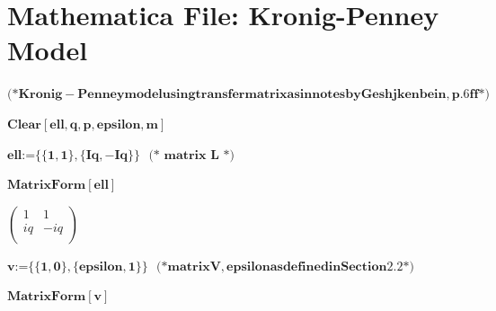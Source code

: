 

\chapter{Mathematica File: Kronig-Penney Model}{\label{Mathematica File: Kronig-Penney Model}


\begin{doublespace}
\noindent\(\pmb{\text{(*} \text{Kronig}-\text{Penney} \text{model} \text{using} \text{transfer} \text{matrix} \text{as} \text{in} \text{notes} \text{by}
\text{Geshjkenbein}, p.6 \text{ff} \text{*)}}\)
\end{doublespace}

\begin{doublespace}
\noindent\(\pmb{\text{Clear}[\text{ell},q,p,\text{epsilon},m]\text{     }}\)
\end{doublespace}

\begin{doublespace}
\noindent\(\pmb{\text{ell}\text{:=}\{\{1,1\},\{I q, -I q\}\}\text{      }\text{(* matrix L *)}}\)
\end{doublespace}

\begin{doublespace}
\noindent\(\pmb{\text{MatrixForm}[\text{ell}]}\)
\end{doublespace}

\begin{doublespace}
\noindent\(\left(
\begin{array}{cc}
 1 & 1 \\
 i q & -i q \\
\end{array}
\right)\)
\end{doublespace}

\begin{doublespace}
\noindent\(\pmb{v\text{:=}\{\{1,0\},\{\text{epsilon}, 1\}\}\text{    }\text{(*} \text{matrix} V, \text{epsilon} \text{as} \text{defined} \text{in}
\text{Section} 2.2 \text{*)}}\)
\end{doublespace}

\begin{doublespace}
\noindent\(\pmb{\text{MatrixForm}[v]}\)
\end{doublespace}

}
